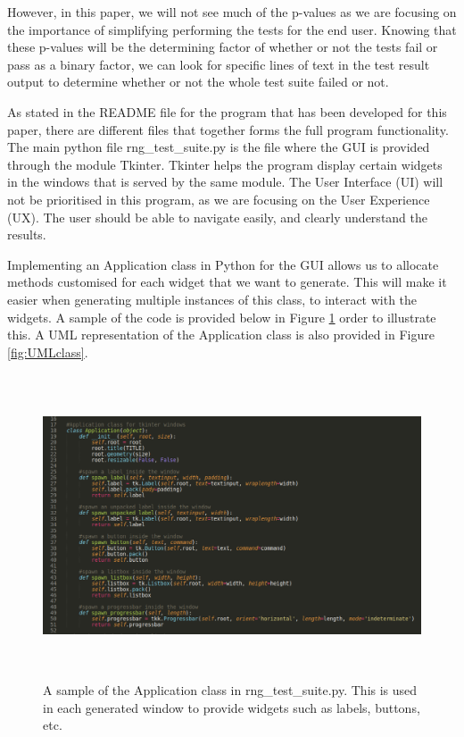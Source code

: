 \documentclass[]{final_report}
\begin{document}
\par{However, in this paper, we will not see much of the p-values as we are focusing on the importance of simplifying performing the tests for the end user. Knowing that these p-values will be the determining factor of whether or not the tests fail or pass as a binary factor, we can look for specific lines of text in the test result output to determine whether or not the whole test suite failed or not.}

\par{As stated in the README file for the program that has been developed for this paper, there are different files that together forms the full program functionality. The main python file rng\_test\_suite.py is the file where the GUI is provided through the module Tkinter. Tkinter helps the program display certain widgets in the windows that is served by the same module. The User Interface (UI) will not be prioritised in this program, as we are focusing on the User Experience (UX). The user should be able to navigate easily, and clearly understand the results.}

\par{Implementing an Application class in Python for the GUI allows us to allocate methods customised for each widget that we want to generate. This will make it easier when generating multiple instances of this class, to interact with the widgets. A sample of the code is provided below in Figure \ref{fig:code_cutout_tkinter} order to illustrate this. A UML representation of the Application class is also provided in Figure \ref{fig:UMLclass}.}

\begin{figure}[h!]
\begin{center}
\includegraphics[height=9cm]{code_cutout_tkinter}
\caption{A sample of the Application class in rng\_test\_suite.py. This is used in each generated window to provide widgets such as labels, buttons, etc.}
\label{fig:code_cutout_tkinter}
\end{center}
\end{figure}
\end{document}
